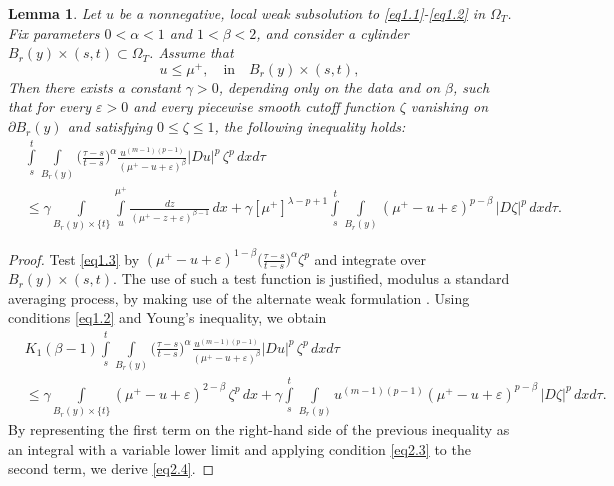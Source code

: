 \documentclass[a4paper,11pt,fullpage]{article}
\numberwithin{equation}{section}
\newtheorem{lemma}{Lemma}[section]
\begin{document}
\begin{lemma}\label{lem2.4}
Let $u$ be a nonnegative, local weak subsolution to \eqref{eq1.1}-\eqref{eq1.2} in $\Omega_T$. Fix parameters $0<\alpha<1$ and $1<\beta<2$, and consider a cylinder $B_r(y)\times(s,t)\subset\Omega_T$. Assume that
\begin{equation}\label{eq2.3}
u\leqslant \mu^+,\quad \text{in}\quad B_r(y)\times (s, t),
\end{equation}
Then there exists a constant $\gamma>0$, depending only on the data and on $\beta$, such that for every $\varepsilon>0$ and every piecewise smooth cutoff function $\zeta$ vanishing on $\partial B_r(y)$ and satisfying $0\leqslant\zeta\leqslant 1$, the following inequality holds:
\begin{equation}\label{eq2.4}
\begin{aligned}
&\int\limits_s^t\int\limits_{B_r(y)}\Big(\frac{\tau-s}{t-s}\Big)^\alpha\frac{u^{(m-1)(p-1)}}{(\mu^+-u+\varepsilon)^\beta}|D u|^{p}\,\zeta^{p}\,dx d\tau
\\&\leqslant\gamma \int\limits_{B_r(y)\times\{t\}}\int\limits^{\mu^+}_u\frac{d z}{(\mu^+-z +\varepsilon)^{\beta-1}}\,dx
+\gamma [\mu^+]^{\lambda-p+1}\int\limits_s^t\int\limits_{B_r(y)}(\mu^+-u+\varepsilon)^{p-\beta}\,|D \zeta|^{p}\,dx d\tau.
\end{aligned}
\end{equation}
\end{lemma}
\begin{proof}
Test \eqref{eq1.3} by $(\mu^+-u +\varepsilon)^{1-\beta}\big(\frac{\tau-s}{t-s}\big)^\alpha \zeta^{p}$ and integrate over $B_r(y)\times(s, t)$.  The use of such a test function is justified, modulus a standard
 averaging process, by making use of the alternate weak formulation \cite{KL}. Using conditions \eqref{eq1.2} and Young's inequality, we obtain
\begin{equation*}
\begin{aligned}
&K_1(\beta-1)\int\limits_s^t\int\limits_{B_r(y)}\Big(\frac{\tau-s}{t-s}\Big)^\alpha
\frac{u^{(m-1)(p-1)}}{(\mu^+-u +\varepsilon)^\beta}|D u|^{p}\,\zeta^{p}\,dx d\tau
\\&\leqslant
\gamma \int\limits_{B_r(y)\times\{t\}}(\mu^+-u +\varepsilon)^{2-\beta}\,\zeta^{p}\,dx+
\gamma  \int\limits_s^t\int\limits_{B_r(y)}u^{(m-1)(p-1)}(\mu^+-u+\varepsilon)^{p-\beta}\,|D \zeta|^{p}\,dx d\tau.
\end{aligned}
\end{equation*}
By representing the first term on the right-hand side of the previous inequality as an integral with a variable lower limit and applying condition \eqref{eq2.3} to the second term, we derive \eqref{eq2.4}.
\end{proof}
\end{document}
